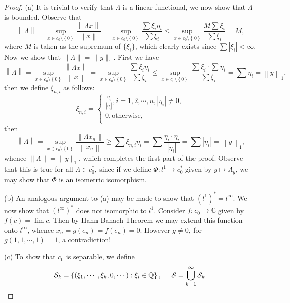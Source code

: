 \begin{proof}
(a) It is trivial to verify that $\Lambda$ is a linear functional, we now show that $\Lambda$ is bounded. Observe that 
$$
\left\| \Lambda \right\| =\mathop {\mathrm{sup}} \limits_{x\in c_0\setminus \left\{ 0 \right\}}\frac{\left\| \Lambda x \right\|}{\left\| x \right\|}=\mathop {\mathrm{sup}} \limits_{x\in c_0\setminus \left\{ 0 \right\}}\frac{\sum{\xi _i\eta _i}}{\sum{\xi _i}}\le \mathop {\mathrm{sup}} \limits_{x\in c_0\setminus \left\{ 0 \right\}}\frac{M\sum{\xi _i}}{\sum{\xi _i}}=M,
$$
where $M$ is taken as the supremum of $\{\xi_i\}$, which clearly exists since $\sum|\xi_i|<\infty$. Now we show that $\|\Lambda\|=\|y\|_1$. First we have 
$$
\left\| \Lambda \right\| =\mathop {\mathrm{sup}} \limits_{x\in c_0\setminus \left\{ 0 \right\}}\frac{\left\| \Lambda x \right\|}{\left\| x \right\|}=\mathop {\mathrm{sup}} \limits_{x\in c_0\setminus \left\{ 0 \right\}}\frac{\sum{\xi _i\eta _i}}{\sum{\xi _i}}\le \mathop {\mathrm{sup}} \limits_{x\in c_0\setminus \left\{ 0 \right\}}\frac{\sum{\xi _i}\cdot \sum{\eta _i}}{\sum{\xi _i}}=\sum{\eta _i}=\left\| y \right\| _1,
$$
then we define $\xi_{n,i}$ as follows: 
$$
\xi _{n,i}=\begin{cases}
	\frac{\eta _i}{\left| \eta _i \right|},i=1,2,\cdots ,n,\left| \eta _i \right|\ne 0,\\
	0,\text{otherwise},\\
\end{cases}
$$
then 
$$
\left\| \Lambda \right\| =\mathop {\mathrm{sup}} \limits_{x\in c_0\setminus \left\{ 0 \right\}}\frac{\left\| \Lambda x_n \right\|}{\left\| x_n \right\|}\ge \sum{\xi _{n,i}\eta _i}=\sum{\frac{\overline{\eta _i}\cdot \eta _i}{\left| \eta _i \right|}}=\sum{\left| \eta _i \right|}=\left\| y \right\| _1,
$$
whence $\|\Lambda\|=\|y\|_1$, which completes the first part of the proof. Observe that this is true for all $\Lambda\in c_0^*$, since if we define $\Phi:l^1\to c_0^*$ given by $y\mapsto\Lambda_y$, we may show that $\Phi$ is an isometric isomorphism.\par
(b) An analogous argument to (a) may be made to show that $(l^1)^*=l^\infty$. We now show that $(l^\infty)^*$ does not isomorphic to $l^1$. Consider $f: c_0\to\mathbb{C}$ given by $f(c)=\lim c$. Then by Hahn-Banach Theorem we may extend this function onto $l^\infty$, whence $x_n=g(e_n)=f(e_n)=0$. However $g\ne 0$, for $g(1,1,\cdots,1)=1$, a contradiction!\par
(c) To show that $c_0$ is separable, we define 
$$
\mathcal{S} _k=\left\{ \left( \xi _1,\cdots ,\xi _k,0,\cdots \right) :\xi _i\in \mathbb{Q} \right\} ,\hspace{0.5cm}\mathcal{S} =\bigcup_{k=1}^{\infty}{\mathcal{S} _k}.
$$
\end{proof}
